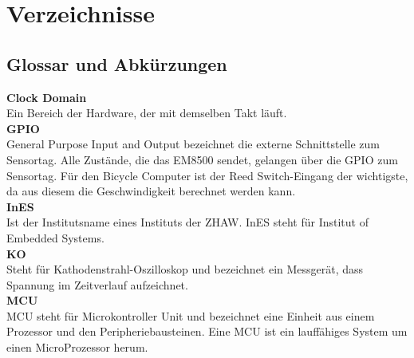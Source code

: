 \chapter{Verzeichnisse}




\renewcommand{\bibsection}{\section{\refname}}  %
\makeatletter
\makeatother






\section{Glossar und Abkürzungen}\label{glossar}

\textbf{Clock Domain}\\
\forceindent Ein Bereich der Hardware, der mit demselben Takt läuft.\\

\textbf{GPIO}\\
\forceindent General Purpose Input and Output bezeichnet die externe Schnittstelle zum Sensortag. Alle Zustände, die das EM8500 sendet, gelangen über die GPIO zum Sensortag. Für den Bicycle Computer ist der Reed Switch-Eingang der wichtigste, da aus diesem die Geschwindigkeit berechnet werden kann.\\

\textbf{InES}\\
\forceindent Ist der Institutsname eines Instituts der ZHAW. InES steht für Institut of Embedded Systems.\\

\textbf{KO}\\
\forceindent Steht für Kathodenstrahl-Oszilloskop und bezeichnet ein Messgerät, dass Spannung im Zeitverlauf aufzeichnet.\\

\textbf{MCU}\\
\forceindent MCU steht für Microkontroller Unit und bezeichnet eine Einheit aus einem Prozessor und den Peripheriebausteinen. Eine MCU ist ein lauffähiges System um einen MicroProzessor herum.\\


